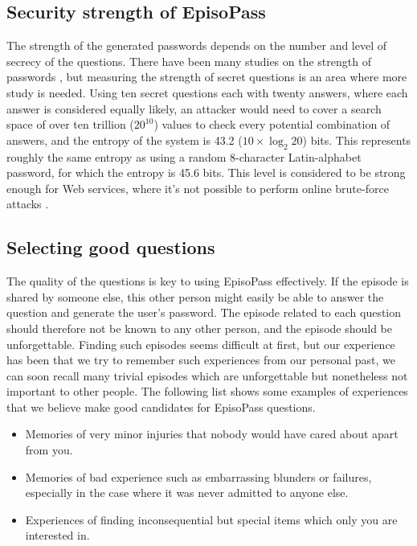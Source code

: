 \documentclass[runningheads,a4paper]{llncs}
\begin{document}
\subsection{Security strength of EpisoPass}

The strength of the generated passwords depends on the number and 
level of secrecy of the questions.
%
There have been many studies on the strength of passwords
\cite{Hayashi:2011:DSP:1978942.1979326,Komanduri:2011:PPM:1978942.1979321}, %
but measuring the strength of secret questions is an area where more study is needed.
Using ten secret questions each with twenty answers, where each answer is considered equally likely,
an attacker would need to cover a search space of over ten trillion ($20^{10}$) values to check
every potential combination of answers,
and the entropy of the system is 43.2 ($10 \times \log_2 20$) bits.  %
%
This represents roughly the same entropy as using a random 8-character Latin-alphabet
password, for which the entropy is 45.6 bits.
This level is considered to be strong enough for Web services,
where it's not possible to perform online brute-force attacks \cite{Florencio:2007:SWP:1361419.1361429}.

\subsection{Selecting good questions}

The quality of the questions is key to using EpisoPass effectively.
If the episode is shared by someone else,
this other person might easily be able to answer the question and generate the
user's password.
%
The episode related to each question should therefore not be known to any other person,
and the episode should be unforgettable.
%
Finding such episodes seems difficult at first, but our experience
has been that we try to remember such experiences from our personal past,
we can soon recall many trivial episodes which are unforgettable but
nonetheless not important to other people.
%
The following list shows some examples of experiences that we believe make good candidates for
EpisoPass questions.

\begin{itemize}
\item Memories of very minor injuries that nobody would have cared about apart from you.

\item Memories of bad experience such as embarrassing blunders or failures,
especially in the case where it was never admitted to anyone else.

\item Experiences of finding inconsequential but special items which only you are interested in.
\end{itemize}
\end{document}
